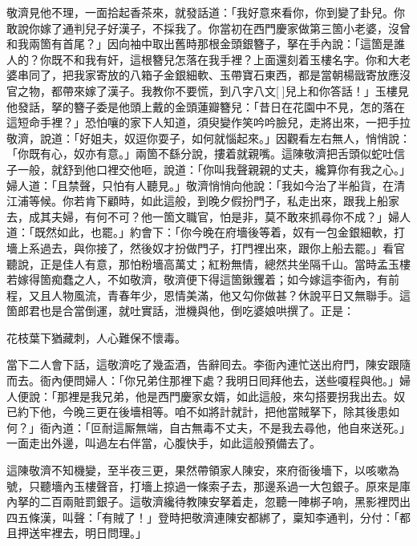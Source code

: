 敬濟見他不理，一面拾起香茶來，就發話道：「我好意來看你，你到變了卦兒。你敢說你嫁了通判兒子好漢子，不採我了。你當初在西門慶家做第三箇小老婆，沒曾和我兩箇有首尾？」因向袖中取出舊時那根金頭銀簪子，拏在手內說：「這箇是誰人的？你既不和我有奸，這根簪兒怎落在我手裡？上面還刻着玉樓名字。你和大老婆串同了，把我家寄放的八箱子金銀細軟、玉帶寶石東西，都是當朝楊戩寄放應沒官之物，都帶來嫁了漢子。我教你不要慌，到八字八文[]兒上和你答話！」玉樓見他發話，拏的簪子委是他頭上戴的金頭蓮瓣簪兒：「昔日在花園中不見，怎的落在這短命手裡？」恐怕嚷的家下人知道，須臾變作笑吟吟臉兒，走將出來，一把手拉敬濟，說道：「好姐夫，奴逗你耍子，如何就惱起來。」因觀看左右無人，悄悄說：「你既有心，奴亦有意。」{}兩箇不繇分說，摟着就親嘴。這陳敬濟把舌頭似蛇吐信子一般，就舒到他口裡交他咂，說道：「你叫我聲親親的丈夫，纔算你有我之心。」婦人道：「且禁聲，只怕有人聽見。」敬濟悄悄向他說：「我如今治了半船貨，在清江浦等候。你若肯下顧時，如此這般，到晚夕假扮門子，私走出來，跟我上船家去，成其夫婦，有何不可？他一箇文職官，怕是非，莫不敢來抓尋你不成？」{}婦人道：「既然如此，也罷。」約會下：「你今晚在府墻後等着，奴有一包金銀細軟，打墻上系過去，與你接了，然後奴才扮做門子，打門裡出來，跟你上船去罷。」看官聽說，正是佳人有意，那怕粉墻高萬丈；紅粉無情，總然共坐隔千山。當時孟玉樓若嫁得箇痴蠢之人，不如敬濟，敬濟便下得這箇鍬钁着；如今嫁這李衙內，有前程，又且人物風流，青春年少，恩情美滿，他又勾你做甚？休說平日又無聯手。{}{}這箇郎君也是合當倒運，就吐實話，泄機與他，倒吃婆娘哄撰了。正是：

\begin{myquote}
花枝葉下猶藏刺，人心難保不懷毒。
\end{myquote}

當下二人會下話，這敬濟吃了幾盃酒，告辭囘去。李衙內連忙送出府門，陳安跟隨而去。衙內便問婦人：「你兄弟住那裡下處？我明日囘拜他去，送些嗄程與他。」婦人便說：「那裡是我兄弟，他是西門慶家女婿，如此這般，來勾搭要拐我出去。奴已約下他，今晚三更在後墻相等。咱不如將計就計，把他當賊拏下，除其後患如何？」{}衙內道：「叵耐這厮無端，自古無毒不丈夫，不是我去尋他，他自來送死。」一面走出外邊，叫過左右伴當，心腹快手，如此這般預備去了。

這陳敬濟不知機變，至半夜三更，果然帶領家人陳安，來府衙後墻下，以咳嗽為號，只聽墻內玉樓聲音，打墻上掠過一條索子去，那邊系過一大包銀子。原來是庫內拏的二百兩賍罰銀子。這敬濟纔待教陳安拏着走，忽聽一陣梆子响，黑影裡閃出四五條漢，叫聲：「有賊了！」登時把敬濟連陳安都綁了，稟知李通判，分付：「都且押送牢裡去，明日問理。」

